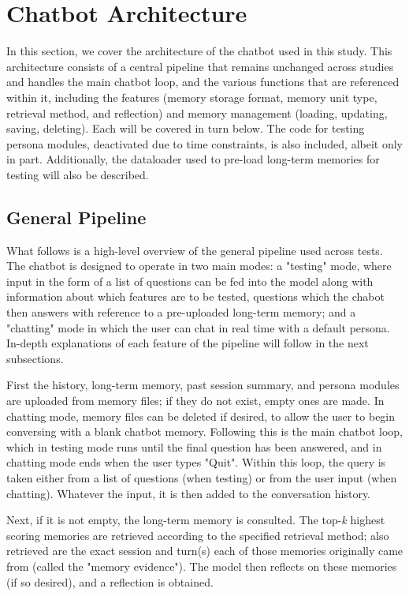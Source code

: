 \section{Chatbot Architecture}

In this section, we cover the architecture of the chatbot used in this study. This architecture consists of a central pipeline that remains unchanged across studies and handles the main chatbot loop, and the various functions that are referenced within it, including the features (memory storage format, memory unit type, retrieval method, and reflection) and memory management (loading, updating, saving, deleting). Each will be covered in turn below. The code for testing persona modules, deactivated due to time constraints, is also included, albeit only in part. Additionally, the dataloader used to pre-load long-term memories for testing will also be described.



\subsection{General Pipeline}

What follows is a high-level overview of the general pipeline used across tests. The chatbot is designed to operate in two main modes: a "testing" mode, where input in the form of a list of questions can be fed into the model along with information about which features are to be tested, questions which the chabot then answers with reference to a pre-uploaded long-term memory; and a "chatting" mode in which the user can chat in real time with a default persona. In-depth explanations of each feature of the pipeline will follow in the next subsections.

First the history, long-term memory, past session summary, and persona modules are uploaded from memory files; if they do not exist, empty ones are made. In chatting mode, memory files can be deleted if desired, to allow the user to begin conversing with a blank chatbot memory. Following this is the main chatbot loop, which in testing mode runs until the final question has been answered, and in chatting mode ends when the user types "Quit". Within this loop, the query is taken either from a list of questions (when testing) or from the user input (when chatting). Whatever the input, it is then added to the conversation history.
 
Next, if it is not empty, the long-term memory is consulted. The top-\textit{k} highest scoring memories are retrieved according to the specified retrieval method; also retrieved are the exact session and turn(s) each of those memories originally came from (called the "memory evidence"). The model then reflects on these memories (if so desired), and a reflection is obtained. 

